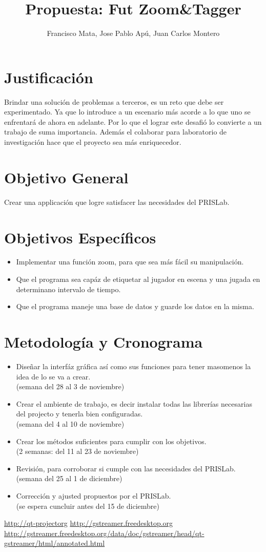 \documentclass[a4paper]{article}
\title{Propuesta: Fut Zoom\&Tagger}
\author{Francisco Mata, Jose Pablo Apú, Juan Carlos Montero}
\begin{document}
\maketitle

\section*{Justificación}

Brindar una solución de problemas a terceros, es un reto que debe ser experimentado. Ya que lo introduce a un escenario más acorde a lo que uno se enfrentará de ahora en adelante. Por lo que el lograr este desafió lo convierte a un trabajo de suma importancia. Además el colaborar para laboratorio de investigación hace que el proyecto sea más enriquecedor. 

\section*{Objetivo General}
Crear una applicación que logre satisfacer las necesidades del PRISLab.

\section*{Objetivos Específicos}
\begin{itemize}
\item Implementar una función zoom, para que sea más fácil su manipulación.
\item Que el programa sea capáz de etiquetar al jugador en escena y una jugada en determinano intervalo de tiempo.
\item Que el programa maneje una base de datos y guarde los datos en la misma.
\end{itemize}


\section*{Metodología y Cronograma}
\begin{itemize}
\item Diseñar la interfáz gráfica así como sus funciones para tener masomenos la idea de lo se va a crear. \\(semana del 28 al 3 de noviembre)
\item Crear el ambiente de trabajo, es decir instalar todas las librerías necesarias del projecto y tenerla bien configuradas. \\(semana del 4 al 10 de noviembre)
\item Crear los métodos suficientes para cumplir con los objetivos. \\(2 semanas: del 11 al 23 de noviembre)
\item Revisión, para corroborar si cumple con las necesidades del PRISLab. \\(semana del 25 al 1 de diciembre)
\item Corrección y ajusted propuestos por el PRISLab. \\(se espera cuncluir antes del 15 de diciembre)
\end{itemize}

\begin{thebibliography}{10}
\url{http://qt-projectorg}
\url{http://gstreamer.freedesktop.org}
\url{http://gstreamer.freedesktop.org/data/doc/gstreamer/head/qt-gstreamer/html/annotated.html}
\end{thebibliography}
\end{document}
